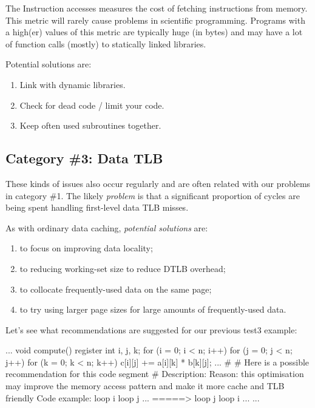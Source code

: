 The Instruction accesses measures the cost of fetching instructions from memory. This metric will rarely cause problems in scientific programming. Programs with a high(er) values of this metric are typically huge (in bytes) and may have a lot of function calls (mostly) to statically linked libraries.

Potential solutions are:

\begin{enumerate}
  \item  Link with dynamic libraries.
  \item  Check for dead code / limit your code.
  \item  Keep often used subroutines together.
\end{enumerate}

\subsection{Category \#3: Data TLB}
\label{subsec:CAT3_Data_TLB}

These kinds of issues also occur regularly and are often related with our problems in category \#1. The likely \emph{problem} is that a significant proportion of cycles are being spent handling first-level data TLB misses.

As with ordinary data caching, \emph{potential solutions} are:

\begin{enumerate}
  \item  to focus on improving data locality;
  \item  to reducing working-set size to reduce DTLB overhead;
  \item  to collocate frequently-used data on the same page;
  \item  to try using larger page sizes for large amounts of frequently-used data.
\end{enumerate}

Let's see what recommendations are suggested for our previous test3 example:

\begin{prompt}
...
void compute()
{
register int i, j, k;
for (i = 0; i < n; i++)
  for (j = 0; j < n; j++)
    for (k = 0; k < n; k++)
      c[i][j] += a[i][k] * b[k][j];
}
...
\#
\# Here is a possible recommendation for this code segment
\#
Description: %
Reason: this optimisation may improve the memory access pattern and make it more cache and TLB friendly
Code example:
loop i {
  loop j {...}
}
=====>
loop j {
  loop i {...}
}
...
\end{prompt}

